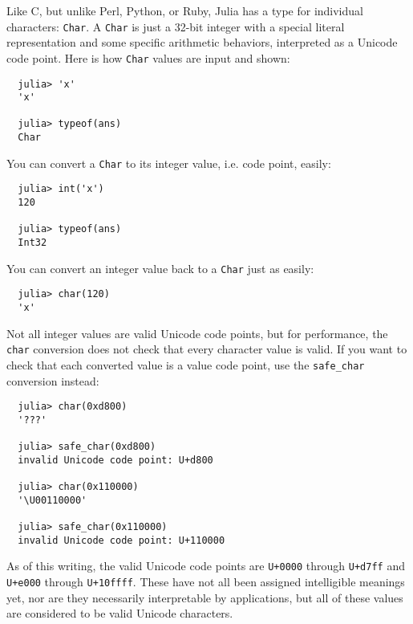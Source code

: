 \documentclass{article}
\begin{document}
Like C, but unlike Perl, Python, or Ruby, Julia has a type for individual characters: \verb|Char|.
A \verb|Char| is just a 32-bit integer with a special literal representation and some specific arithmetic behaviors, interpreted as a Unicode code point.
Here is how \verb|Char| values are input and shown:
\begin{verbatim}
  julia> 'x'
  'x'

  julia> typeof(ans)
  Char
\end{verbatim}
You can convert a \verb|Char| to its integer value, i.e. code point, easily:
\begin{verbatim}
  julia> int('x')
  120

  julia> typeof(ans)
  Int32
\end{verbatim}
You can convert an integer value back to a \verb|Char| just as easily:
\begin{verbatim}
  julia> char(120)
  'x'
\end{verbatim}
Not all integer values are valid Unicode code points, but for performance, the \verb|char| conversion does not check that every character value is valid.
If you want to check that each converted value is a value code point, use the \verb|safe_char| conversion instead:
\begin{verbatim}
  julia> char(0xd800)
  '???'

  julia> safe_char(0xd800)
  invalid Unicode code point: U+d800

  julia> char(0x110000)
  '\U00110000'

  julia> safe_char(0x110000)
  invalid Unicode code point: U+110000
\end{verbatim}
As of this writing, the valid Unicode code points are \verb|U+0000| through \verb|U+d7ff| and \verb|U+e000| through \verb|U+10ffff|.
These have not all been assigned intelligible meanings yet, nor are they necessarily interpretable by applications, but all of these values are considered to be valid Unicode characters.
\end{document}

